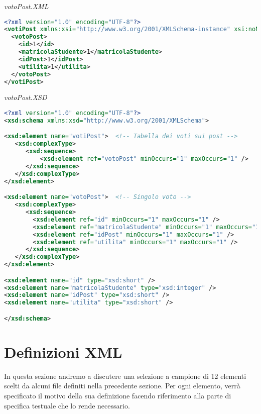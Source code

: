 \documentclass [a4paper,11pt]{book}
\begin{document}
\medskip

\emph{votoPost.XML}

\label{sec:votoPost}

\begin{lstlisting}[language=XML]
<?xml version="1.0" encoding="UTF-8"?>
<votiPost xmlns:xsi="http://www.w3.org/2001/XMLSchema-instance" xsi:noNamespaceSchemaLocation="votoPost.xsd">
  <votoPost>
    <id>1</id>
    <matricolaStudente>1</matricolaStudente>
    <idPost>1</idPost>
    <utilita>1</utilita>
  </votoPost>
</votiPost>
\end{lstlisting}

\emph{votoPost.XSD}

\begin{lstlisting}[language=XML]
<?xml version="1.0" encoding="UTF-8"?>
<xsd:schema xmlns:xsd="http://www.w3.org/2001/XMLSchema">

<xsd:element name="votiPost">  <!-- Tabella dei voti sui post -->
   <xsd:complexType> 
      <xsd:sequence>
	      <xsd:element ref="votoPost" minOccurs="1" maxOccurs="1" />
      </xsd:sequence>
   </xsd:complexType>
</xsd:element>

<xsd:element name="votoPost">  <!-- Singolo voto -->
   <xsd:complexType> 
      <xsd:sequence>
        <xsd:element ref="id" minOccurs="1" maxOccurs="1" /> 
        <xsd:element ref="matricolaStudente" minOccurs="1" maxOccurs="1" />
        <xsd:element ref="idPost" minOccurs="1" maxOccurs="1" /> 
        <xsd:element ref="utilita" minOccurs="1" maxOccurs="1" /> 
      </xsd:sequence>
   </xsd:complexType>
</xsd:element>

<xsd:element name="id" type="xsd:short" />
<xsd:element name="matricolaStudente" type="xsd:integer" />
<xsd:element name="idPost" type="xsd:short" />
<xsd:element name="utilita" type="xsd:short" />

</xsd:schema>
\end{lstlisting}

\medskip

\section{Definizioni XML}

In questa sezione andremo a discutere una selezione a campione di 12 elementi scelti da alcuni file definiti nella precedente sezione. Per ogni elemento, verrà specificato il motivo della sua definizione facendo riferimento alla parte di specifica testuale che lo rende necessario.
\end{document}
